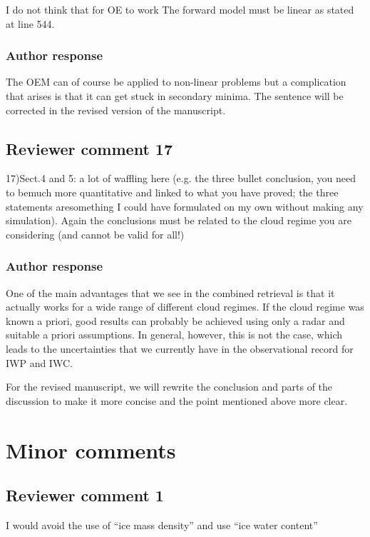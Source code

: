 \documentclass[11pt]{scrartcl}
\begin{document}
I do not think that for OE to work The forward model must be linear as stated at line 544.

\subsubsection*{Author response}

The OEM can of course be applied to non-linear problems but a complication that
arises is that it can get stuck in secondary minima. The sentence will be
corrected in the revised version of the manuscript.

\subsection*{Reviewer comment 17}

17)Sect.4 and 5: a lot of waffling here (e.g. the three bullet conclusion, you
need to bemuch more quantitative and linked to what you have proved; the three
statements aresomething I could have formulated on my own without making any
simulation). Again the conclusions must be related to the cloud regime you are
considering (and cannot be valid for all!)

\subsubsection*{Author response}

One of the main advantages that we see in the combined retrieval is that it
actually works for a wide range of different cloud regimes. If the cloud regime
was known a priori, good results can probably be achieved using only a radar and
suitable a priori assumptions. In general, however, this is not the case, which
leads to the uncertainties that we currently have in the observational record
for IWP and IWC.

For the revised manuscript, we will rewrite the conclusion and parts of the discussion to make
it more concise and the point mentioned above more clear.

\section{Minor comments}

\subsection*{Reviewer comment 1}
I would avoid the use of “ice mass density” and use “ice water content”
\end{document}
